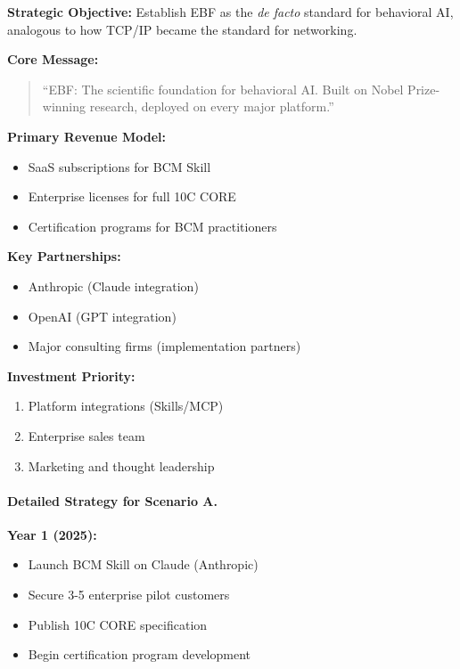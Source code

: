 \begin{tcolorbox}[colback=green!5!white, colframe=green!75!black,
    title=Strategic Position A: The Behavioral Standard]

\textbf{Strategic Objective:}
Establish EBF as the \textit{de facto} standard for behavioral AI, analogous to how TCP/IP became the standard for networking.

\textbf{Core Message:}
\begin{quote}
``EBF: The scientific foundation for behavioral AI. Built on Nobel Prize-winning research, deployed on every major platform.''
\end{quote}

\textbf{Primary Revenue Model:}
\begin{itemize}[nosep]
\item SaaS subscriptions for BCM Skill
\item Enterprise licenses for full 10C CORE
\item Certification programs for BCM practitioners
\end{itemize}

\textbf{Key Partnerships:}
\begin{itemize}[nosep]
\item Anthropic (Claude integration)
\item OpenAI (GPT integration)
\item Major consulting firms (implementation partners)
\end{itemize}

\textbf{Investment Priority:}
\begin{enumerate}[nosep]
\item Platform integrations (Skills/MCP)
\item Enterprise sales team
\item Marketing and thought leadership
\end{enumerate}

\end{tcolorbox}

\paragraph{Detailed Strategy for Scenario A.}

\textbf{Year 1 (2025):}
\begin{itemize}
\item Launch BCM Skill on Claude (Anthropic)
\item Secure 3-5 enterprise pilot customers
\item Publish 10C CORE specification
\item Begin certification program development
\end{itemize}

